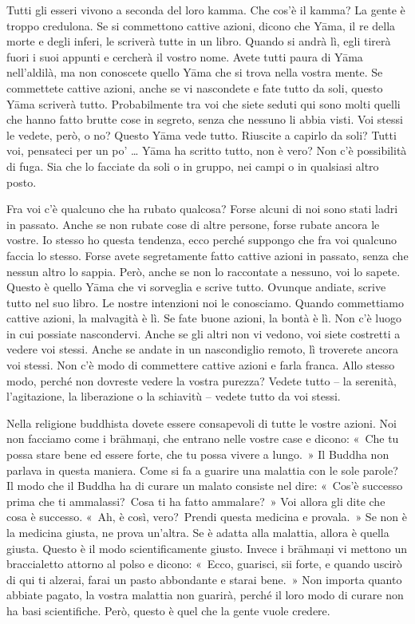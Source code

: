 Tutti gli esseri vivono a seconda del loro kamma. Che cos'è il
kamma? La gente è troppo credulona. Se si commettono cattive
azioni, dicono che Yāma, il re della morte e degli inferi, le scriverà
tutte in un libro. Quando si andrà lì, egli tirerà fuori i suoi appunti
e cercherà il vostro nome. Avete tutti paura di Yāma nell'aldilà, ma non
conoscete quello Yāma che si trova nella vostra mente. Se commettete
cattive azioni, anche se vi nascondete e fate tutto da soli, questo Yāma
scriverà tutto. Probabilmente tra voi che siete seduti qui sono molti
quelli che hanno fatto brutte cose in segreto, senza che nessuno li
abbia visti. Voi stessi le vedete, però, o no? Questo Yāma vede tutto.
Riuscite a capirlo da soli? Tutti voi, pensateci per un po' \ldots{} Yāma ha
scritto tutto, non è vero? Non c'è possibilità di fuga. Sia che lo
facciate da soli o in gruppo, nei campi o in qualsiasi altro posto.

Fra voi c'è qualcuno che ha rubato qualcosa? Forse alcuni di noi sono
stati ladri in passato. Anche se non rubate cose di altre persone, forse
rubate ancora le vostre. Io stesso ho questa tendenza, ecco perché
suppongo che fra voi qualcuno faccia lo stesso. Forse avete segretamente
fatto cattive azioni in passato, senza che nessun altro lo sappia. Però,
anche se non lo raccontate a nessuno, voi lo sapete. Questo è quello
Yāma che vi sorveglia e scrive tutto. Ovunque andiate, scrive tutto nel
suo libro. Le nostre intenzioni noi le conosciamo. Quando commettiamo
cattive azioni, la malvagità è lì. Se fate buone azioni, la bontà è lì.
Non c'è luogo in cui possiate nascondervi. Anche se gli altri non vi
vedono, voi siete costretti a vedere voi stessi. Anche se andate in un
nascondiglio remoto, lì troverete ancora voi stessi. Non c'è modo di
commettere cattive azioni e farla franca. Allo stesso modo, perché non
dovreste vedere la vostra purezza? Vedete tutto -- la serenità,
l'agitazione, la liberazione o la schiavitù -- vedete tutto da voi
stessi.

Nella religione buddhista dovete essere consapevoli di tutte le vostre
azioni. Noi non facciamo come i brāhmaṇi, che entrano nelle vostre case
e dicono: «~Che tu possa stare bene ed essere forte, che tu possa vivere
a lungo.~» Il Buddha non parlava in questa maniera. Come si fa a guarire
una malattia con le sole parole? Il modo che il Buddha ha di curare un
malato consiste nel dire: «~Cos'è successo prima che ti ammalassi?~Cosa
ti ha fatto ammalare?~» Voi allora gli dite che cosa è successo. «~Ah, è
così, vero?~Prendi questa medicina e provala.~» Se non è la medicina
giusta, ne prova un'altra. Se è adatta alla malattia, allora è quella
giusta. Questo è il modo scientificamente giusto. Invece i brāhmaṇi vi
mettono un braccialetto attorno al polso e dicono: «~Ecco, guarisci, sii
forte, e quando uscirò di qui ti alzerai, farai un pasto abbondante e
starai bene.~» Non importa quanto abbiate pagato, la vostra malattia non
guarirà, perché il loro modo di curare non ha basi scientifiche. Però,
questo è quel che la gente vuole credere.

